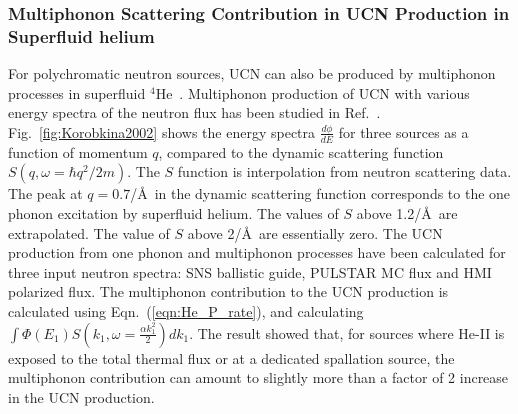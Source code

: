 

 \subsubsection{Multiphonon Scattering Contribution in UCN Production
   in Superfluid helium}
 For polychromatic neutron sources, UCN can also be produced by
 multiphonon processes in superfluid
 $^4$He~\cite{Korobkina2002,Schmidt2009}. Multiphonon production of
 UCN with various energy spectra of the neutron flux has been studied
 in Ref.~\cite{Korobkina2002}.  Fig.~\ref{fig:Korobkina2002} shows the
 energy spectra $\frac{d\phi}{dE}$ for three sources as a function of
 momentum $q$, compared to the dynamic scattering function
 $S(q,\omega=\hbar q^2/2m)$. The $S$ function is interpolation from
 neutron scattering data. The peak at $q=0.7$/\AA~in the dynamic
 scattering function corresponds to the one phonon excitation by
 superfluid helium. The values of $S$ above 1.2/\AA~are
 extrapolated. The value of $S$ above 2/\AA~are essentially zero.  The
 UCN production from one phonon and multiphonon processes have been
 calculated for three input neutron spectra: SNS ballistic guide,
 PULSTAR MC flux and HMI polarized flux.  The multiphonon contribution
 to the UCN production is calculated using Eqn.~(\ref{eqn:He_P_rate}),
 and calculating
 $\int \Phi(E_1)S(k_1,\omega=\frac{\alpha k_1^2}{2}) dk_1$.  The
 result showed that, for sources where He-II is exposed to the total
 thermal flux or at a dedicated spallation source, the multiphonon
 contribution can amount to slightly more than a factor of 2 increase
 in the UCN production.





